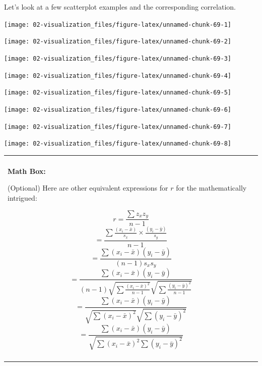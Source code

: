 \documentclass[
]{book}
\newenvironment{mathbox}
{
    \begin{center}
    
    \begin{tabular}{|p{0.8\textwidth}|}
    \rowcolor{LightYellow}
    \hline\\
    \rowcolor{LightYellow}
    \textbf{Math Box:}
}
{
    \\\rowcolor{LightYellow}
    \\\hline
    \end{tabular} 
    \end{center}
}
\begin{document}
Let's look at a few scatterplot examples and the corresponding correlation.

\begin{center}\texttt{[image: 02-visualization\_files/figure-latex/unnamed-chunk-69-1]} \end{center}

\begin{center}\texttt{[image: 02-visualization\_files/figure-latex/unnamed-chunk-69-2]} \end{center}

\begin{center}\texttt{[image: 02-visualization\_files/figure-latex/unnamed-chunk-69-3]} \end{center}

\begin{center}\texttt{[image: 02-visualization\_files/figure-latex/unnamed-chunk-69-4]} \end{center}

\begin{center}\texttt{[image: 02-visualization\_files/figure-latex/unnamed-chunk-69-5]} \end{center}

\begin{center}\texttt{[image: 02-visualization\_files/figure-latex/unnamed-chunk-69-6]} \end{center}

\begin{center}\texttt{[image: 02-visualization\_files/figure-latex/unnamed-chunk-69-7]} \end{center}

\begin{center}\texttt{[image: 02-visualization\_files/figure-latex/unnamed-chunk-69-8]} \end{center}

\begin{mathbox}
(Optional) Here are other equivalent expressions for \(r\) for the
mathematically intrigued:

\[ r = \frac{\sum z_x z_y}{n-1}  \]
\[ = \frac{\sum{\frac{(x_i-\bar{x})}{s_x}\times\frac{(y_i-\bar{y})}{s_y}}}{n-1}\]
\[= \frac{\sum{(x_i-\bar{x})(y_i-\bar{y})}}{(n-1) s_x s_y}\]
\[= \frac{\sum{(x_i-\bar{x})(y_i-\bar{y})}}{(n-1)\sqrt{\sum{\frac{(x_i-\bar{x})^2}{n-1}}}\sqrt{\sum{\frac{(y_i-\bar{y})^2}{n-1}}}}\]
\[=\frac{\sum{(x_i-\bar{x})(y_i-\bar{y})}}{\sqrt{\sum{(x_i-\bar{x})^2}}\sqrt{\sum{(y_i-\bar{y})^2}}}\]
\[=\frac{\sum{(x_i-\bar{x})(y_i-\bar{y})}}{\sqrt{\sum{(x_i-\bar{x})^2\sum{(y_i-\bar{y})^2}}}}\]
\end{mathbox}
\end{document}
